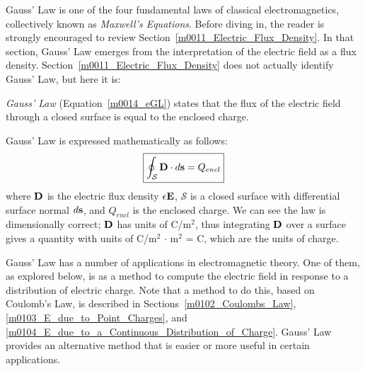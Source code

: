 

\label{m0014_Gauss_Law_Integral_Form} %

Gauss' Law is one of the four fundamental laws of classical electromagnetics, collectively known as \emph{Maxwell's Equations}.
Before diving in, the reader is strongly encouraged to review Section~\ref{m0011_Electric_Flux_Density}.
In that section, Gauss' Law emerges from the interpretation of the electric field as a flux density.  
Section~\ref{m0011_Electric_Flux_Density} does not actually identify Gauss' Law, but here it is:
%
\begin{mdframed}[backgroundcolor=yellow!20,nobreak=true] 
\emph{Gauss' Law} (Equation~\ref{m0014_eGL}) states that the flux of the electric field through a closed surface is equal to the enclosed charge.
\end{mdframed}
%
Gauss' Law is expressed mathematically as follows:
%
\begin{equation}
\boxed{
\oint_{\mathcal S} {\bf D}\cdot d{\bf s} = Q_{encl}
}
\label{m0014_eGL}
\end{equation}
%
where 
${\bf D}$ is the electric flux density $\epsilon{\bf E}$,
${\mathcal S}$ is a closed surface with differential surface normal $d{\bf s}$, and
$Q_{encl}$ is the enclosed charge.
We can see the law is dimensionally correct;  ${\bf D}$ has units of C/m$^{2}$, thus integrating ${\bf D}$ over a surface gives a quantity with units of C/m$^{2}$ $\cdot$ m$^{2}$ = C, which are the units of charge. 
 
Gauss' Law has a number of applications in electromagnetic theory.  
One of them, as explored below, is as a method to compute the electric field in response to a distribution of electric charge.
Note that a method to do this, based on Coulomb's Law, is described in Sections~\ref{m0102_Coulombs_Law}, \ref{m0103_E_due_to_Point_Charges}, and \ref{m0104_E_due_to_a_Continuous_Distribution_of_Charge}.  
Gauss' Law provides an alternative method that is easier or more useful in certain applications.

